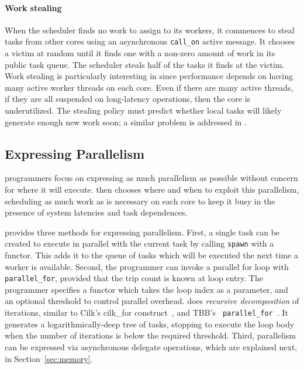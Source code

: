 \paragraph{Work stealing} 
When the scheduler finds no work to assign to its workers, it commences to
steal tasks from other cores using an asynchronous \texttt{call\_on} active
message. It chooses a victim at random until it finds one with a non-zero
amount of work in its public task queue. The scheduler steals half of the
tasks it finds at the victim. Work stealing is particularly interesting in
\Grappa since performance depends on having many active worker threads on each
core. Even if there are many active threads, if they are all suspended on
long-latency operations, then the core is underutilized. 
The
stealing policy 
must predict whether local tasks will likely
generate enough new work soon; a similar problem is addressed in
\cite{vanNieuwpoort:2001}.

\subsection{Expressing Parallelism}


\Grappa programmers focus on expressing as much parallelism as possible
without concern for where it will execute. \Grappa then chooses where and when
to exploit this parallelism, scheduling as much work as is necessary on each
core to keep it busy in the presence of system latencies and task dependences.

\Grappa provides three methods for expressing parallelism. First, a single task can be created to execute in parallel with the current task by calling \texttt{spawn} with a functor. This adds it to the queue of tasks which will be executed the next time a worker is available.
Second,
the programmer can invoke a parallel for loop with \texttt{parallel\_for}, provided that the trip count is
known at loop entry. The programmer specifies a functor which takes the loop index as a parameter, and an optional threshold to control parallel overhead.
\Grappa does {\em recursive decomposition} of iterations, similar to Cilk's
cilk\_for construct~\cite {cilkforimplementation}, and TBB's {\tt
parallel\_for}~\cite{intel_tbb}. It generates a logarithmically-deep tree of
tasks, stopping to execute the loop body when the number of iterations is
below the required threshold.
Third, parallelism can be expressed via asynchronous delegate operations, which are explained next, in Section~\ref{sec:memory}.

